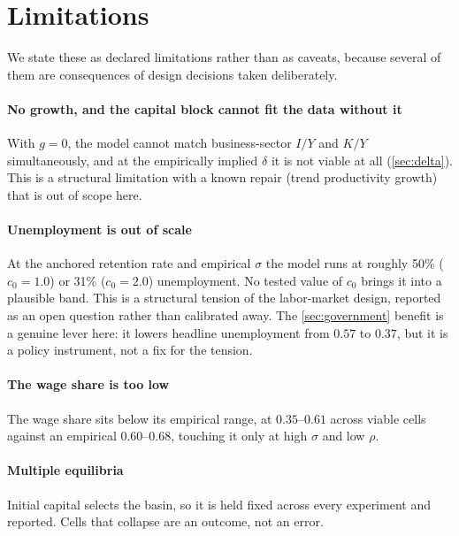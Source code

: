 
\section{Limitations}
\label{sec:limits}

We state these as declared limitations rather than as caveats, because several
of them are consequences of design decisions taken deliberately.

\paragraph{No growth, and the capital block cannot fit the data without it} With
$g = 0$, the model cannot match business-sector $I/Y$ and $K/Y$ simultaneously,
and at the empirically implied $\delta$ it is not viable at all
(\cref{sec:delta}). This is a structural limitation with a known repair (trend
productivity growth) that is out of scope here.

\paragraph{Unemployment is out of scale} At the anchored retention rate and
empirical $\sigma$ the model runs at roughly 50\% ($c_0 = 1.0$) or 31\%
($c_0 = 2.0$) unemployment. No tested value of $c_0$ brings it into a plausible
band. This is a structural tension of the labor-market design, reported as an
open question rather than calibrated away. The \cref{sec:government} benefit is
a genuine lever here: it lowers headline unemployment from $0.57$ to $0.37$, but
it is a policy instrument, not a fix for the tension.

\paragraph{The wage share is too low} The wage share sits below its empirical
range, at $0.35$--$0.61$ across viable cells against an empirical
$0.60$--$0.68$, touching it only at high $\sigma$ and low $\rho$.

\paragraph{Multiple equilibria} Initial capital selects the basin, so it is held
fixed across every experiment and reported. Cells that collapse are an
outcome, not an error.

